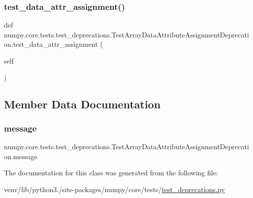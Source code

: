 \subsubsection{\texorpdfstring{test\+\_\+data\+\_\+attr\+\_\+assignment()}{test\_data\_attr\_assignment()}}
{\footnotesize\ttfamily def numpy.\+core.\+tests.\+test\+\_\+deprecations.\+Test\+Array\+Data\+Attribute\+Assignment\+Deprecation.\+test\+\_\+data\+\_\+attr\+\_\+assignment (\begin{DoxyParamCaption}\item[{}]{self }\end{DoxyParamCaption})}



\subsection{Member Data Documentation}
\mbox{\label{classnumpy_1_1core_1_1tests_1_1test__deprecations_1_1TestArrayDataAttributeAssignmentDeprecation_aaee90c08bf312a0403e74be0d66602f4}} 
\subsubsection{\texorpdfstring{message}{message}}
{\footnotesize\ttfamily numpy.\+core.\+tests.\+test\+\_\+deprecations.\+Test\+Array\+Data\+Attribute\+Assignment\+Deprecation.\+message}



The documentation for this class was generated from the following file\+:\begin{DoxyCompactItemize}
\item 
venv/lib/python3./site-\/packages/numpy/core/tests/\hyperlink{core_2tests_2test__deprecations_8py}{test\+\_\+deprecations.\+py}\end{DoxyCompactItemize}
